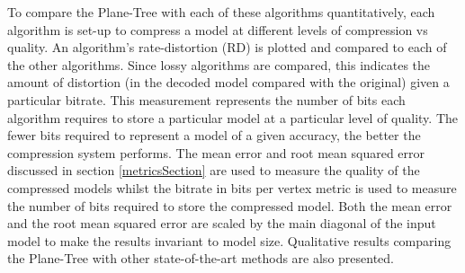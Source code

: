 To compare the Plane-Tree with each of these algorithms quantitatively, each algorithm is set-up to compress a model at different levels of compression vs quality. An algorithm's rate-distortion (RD) is plotted and compared to each of the other algorithms. Since lossy algorithms are compared, this indicates the amount of distortion (in the decoded model compared with the original) given a particular bitrate. This measurement represents the number of bits each algorithm requires to store a particular model at a particular level of quality. The fewer bits required to represent a model of a given accuracy, the better the compression system performs. The mean error and root mean squared error discussed in section \ref{metricsSection} are used to measure the quality of the compressed models whilst the bitrate in bits per vertex metric is used to measure the number of bits required to store the compressed model. Both the mean error and the root mean squared error are scaled by the main diagonal of the input model to make the results invariant to model size. Qualitative results comparing the Plane-Tree with other state-of-the-art methods are also presented. \\


